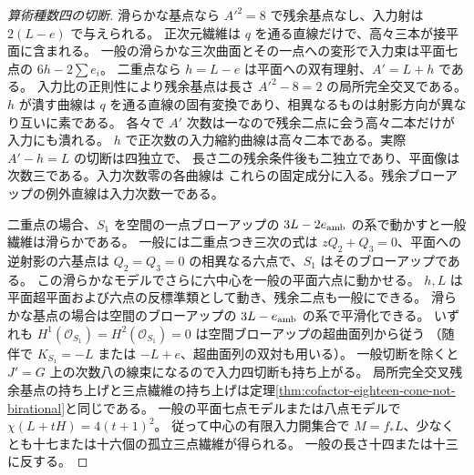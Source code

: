 \begin{proof}[算術種数四の切断]
滑らかな基点なら $A'^2=8$ で残余基点なし、入力射は $2(L-e)$ で与えられる。
正次元繊維は $q$ を通る直線だけで、高々三本が接平面に含まれる。
一般の滑らかな三次曲面とその一点への変形で入力束は平面七点の $6h-2\sum e_i$。
二重点なら $h=L-e$ は平面への双有理射、$A'=L+h$ である。
入力比の正則性により残余基点は長さ $A'^2-8=2$ の局所完全交叉である。
$h$ が潰す曲線は $q$ を通る直線の固有変換であり、相異なるものは射影方向が異なり互いに素である。
各々で $A'$ 次数は一なので残余二点に会う高々二本だけが入力にも潰れる。
$h$ で正次数の入力縮約曲線は高々二本である。実際 $A'-h=L$ の切断は四独立で、
長さ二の残余条件後も二独立であり、平面像は次数三である。入力次数零の各曲線は
これらの固定成分に入る。残余ブローアップの例外直線は入力次数一である。

二重点の場合、$S_1$ を空間の一点ブローアップの $3L-2e_{\rm amb}$ の系で動かすと一般繊維は滑らかである。
一般には二重点つき三次の式は $zQ_2+Q_3=0$、平面への逆射影の六基点は
$Q_2=Q_3=0$ の相異なる六点で、$S_1$ はそのブローアップである。
この滑らかなモデルでさらに六中心を一般の平面六点に動かせる。
$h,L$ は平面超平面および六点の反標準類として動き、残余二点も一般にできる。
滑らかな基点の場合は空間のブローアップの $3L-e_{\rm amb}$ の系で平滑化できる。
いずれも $H^1(\mathcal O_{S_1})=H^2(\mathcal O_{S_1})=0$ は空間ブローアップの超曲面列から従う
（随伴で $K_{S_1}=-L$ または $-L+e$、超曲面列の双対も用いる）。
一般切断を除くと $J'=G$ 上の次数八の線束になるので入力四切断も持ち上がる。
局所完全交叉残余基点の持ち上げと三点繊維の持ち上げは定理\ref{thm:cofactor-eighteen-cone-not-birational}と同じである。
一般の平面七点モデルまたは八点モデルで $\chi(L+tH)=4(t+1)^2$。
従って中心の有限入力開集合で $M=f_*L$、少なくとも十七または十六個の孤立三点繊維が得られる。
一般の長さ十四または十三に反する。
\end{proof}

